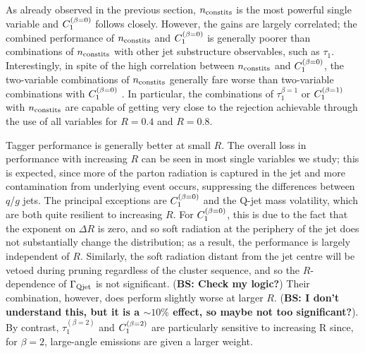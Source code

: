 As already observed in the previous section, $n_{\rm constits}$ is the most powerful single variable and
$C_{1}^{(\beta=0)}$ follows closely. However, the gains are largely correlated; the combined performance of $n_{\rm constits}$ and $C_{1}^{(\beta=0)}$ is generally poorer than combinations of $n_{\rm constits}$ with other jet substructure observables, such as $\tau_1$. Interestingly, in spite of the high correlation between $n_{\rm constits}$ and $C_{1}^{(\beta=0)}$, the two-variable combinations of $n_{\rm constits}$ generally fare worse than two-variable combinations with $C_{1}^{(\beta=0)}$ . In particular,
the combinations of $\tau^{\beta=1}_1$ or $C_{1}^{(\beta=1)}$ with $n_{\rm constits}$ are capable of 
getting very  close to the rejection achievable through the use of all variables for $R=0.4$ and $R=0.8$.


 Tagger performance is generally better at small $R$. 
The overall loss in performance
with increasing $R$ can be seen in most single variables we study; this is expected, since more of the parton radiation is captured in the jet and more contamination from underlying event occurs, suppressing the differences between $q$/$g$ jets. 
The principal exceptions are $C_{1}^{(\beta=0)}$ and 
the Q-jet mass volatility, which are both quite resilient to increasing $R$. For $C_{1}^{(\beta=0)}$, this is due to the fact that the exponent on $\Delta R$ is zero, and so soft radiation at the periphery of the jet does not substantially change the distribution; as a result, the performance is largely independent of $R$.  Similarly, the soft radiation distant from the jet centre will be vetoed during pruning regardless of the cluster sequence, and so the $R$-dependence of $\Gamma_{\rm Qjet}$ is not significant.   ({\bf BS: Check my logic?}) Their combination, however, does perform slightly worse at larger $R$. ({\bf BS: I don't understand this, but it is a $\sim10\%$ effect, so maybe not too significant?}).
By contrast, $\tau_1^{(\beta=2)}$ and $C_{1}^{(\beta=2)}$
are particularly sensitive to increasing R since, for $\beta=2$,
 large-angle emissions are given a larger weight. 

